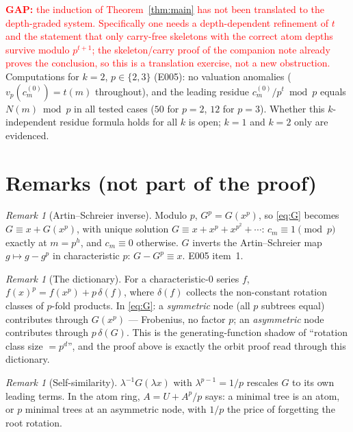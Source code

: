 \documentclass[11pt]{amsart}
\theoremstyle{definition}
\theoremstyle{remark}
\newtheorem{remark}[theorem]{Remark}
\newcommand{\GAP}[1]{\textcolor{red}{\textbf{GAP: }#1}}
\newcommand{\Nn}{N}
\newcommand{\vp}{v_p}
\begin{document}
\GAP{the induction of Theorem~\ref{thm:main} has not been translated to the
depth-graded system. Specifically one needs a depth-dependent refinement of
$t$ and the statement that only carry-free skeletons with the correct atom
depths survive modulo $p^{t+1}$; the skeleton/carry proof of the companion
note already proves the conclusion, so this is a translation exercise, not a
new obstruction.} Computations for $k=2$, $p\in\{2,3\}$ (E005): no valuation
anomalies ($\vp(c_m^{(0)})=t(m)$ throughout), and the leading residue
$c_m^{(0)}/p^t\bmod p$ equals $\Nn(m)\bmod p$ in all tested cases ($50$ for
$p=2$, $12$ for $p=3$). Whether this $k$-independent residue formula holds
for all $k$ is open; $k=1$ and $k=2$ only are evidenced.

\section{Remarks (not part of the proof)}\label{sec:remarks}

\begin{remark}[Artin--Schreier inverse]
Modulo $p$, $G^p=G(x^p)$, so \eqref{eq:G} becomes $G\equiv x+G(x^p)$, with
unique solution $G\equiv x+x^p+x^{p^2}+\cdots$: $c_m\equiv1\pmod p$ exactly
at $m=p^h$, and $c_m\equiv0$ otherwise. $G$ inverts the Artin--Schreier map
$g\mapsto g-g^p$ in characteristic $p$: $G-G^p\equiv x$. E005 item~1.
\end{remark}

\begin{remark}[The dictionary]
For a characteristic-$0$ series $f$, $f(x)^p=f(x^p)+p\,\delta(f)$, where
$\delta(f)$ collects the non-constant rotation classes of $p$-fold products.
In \eqref{eq:G}: a \emph{symmetric} node (all $p$ subtrees equal) contributes
through $G(x^p)$ --- Frobenius, no factor $p$; an \emph{asymmetric} node
contributes through $p\,\delta(G)$. This is the generating-function shadow of
``rotation class size $=p^d$'', and the proof above is exactly the orbit
proof read through this dictionary.
\end{remark}

\begin{remark}[Self-similarity]
$\lambda^{-1}G(\lambda x)$ with $\lambda^{p-1}=1/p$ rescales $G$ to its own
leading terms. In the atom ring, $A=U+A^p/p$ says: a minimal tree is an atom,
or $p$ minimal trees at an asymmetric node, with $1/p$ the price of
forgetting the root rotation.
\end{remark}
\end{document}
